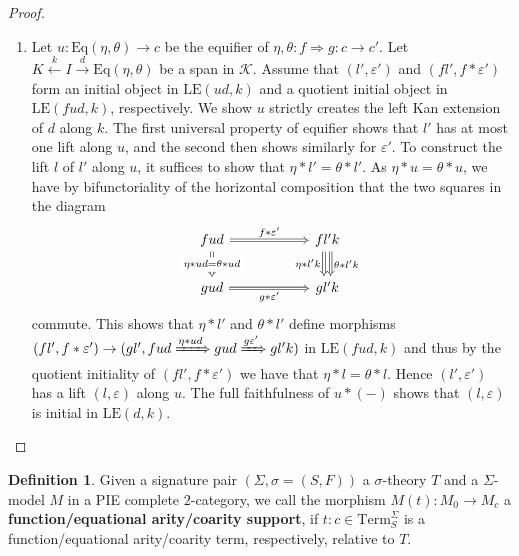 \documentclass[11pt]{article}
\theoremstyle{plain}
\theoremstyle{definition}
\newtheorem{definition}[theorem]{Definition}
\numberwithin{equation}{section}
\newcommand{\K}{\mathcal{K}}
\newcommand{\Term}{\mathrm{Term}}
\newcommand{\Eq}{\mathrm{Eq}}
\newcommand{\LE}{\mathrm{LE}}
\begin{document}
\begin{proof}
\begin{enumerate}
       \item Let $u\colon \Eq(\eta,\theta)\to c$ be the equifier of $\eta,\theta\colon f\Rightarrow g\colon c\to c'$. Let $K\xleftarrow{k}I\xrightarrow{d} \Eq(\eta,\theta)$ be a span in $\K$. Assume that $(l',\varepsilon')$ and $(fl',f*\varepsilon')$ form an initial object in $\LE(ud,k)$ and a quotient initial object in $\LE(fud,k)$, respectively. We show $u$ strictly creates the left Kan extension of $d$ along $k$. The first universal property of equifier shows that $l'$ has at most one lift along $u$, and the second then shows similarly for $\varepsilon'$. To construct the lift $l$ of $l'$ along $u$, it suffices to show that $\eta*l' = \theta*l'$. As $\eta*u = \theta *u$, we have by bifunctoriality of the horizontal composition that the two squares in the diagram
       $$
       \begin{tikzcd}[column sep = 2 cm]
fud \arrow[d, "\eta*ud = \theta*ud" description, Rightarrow] \arrow[r, "f*\varepsilon'", Rightarrow] & fl'k \arrow[d, "\theta*l'k", shift left, Rightarrow] \arrow[d, "\eta*l'k"', shift right, Rightarrow] \\
gud \arrow[r, "g*\varepsilon'"', Rightarrow]                                              & gl'k                                                                         
\end{tikzcd}
       $$
       commute. This shows that $\eta*l'$ and $\theta*l'$ define morphisms $(fl',f*\varepsilon')\to (gl', fud\xRightarrow{\eta*ud}gud\xRightarrow{g\varepsilon'}gl'k)$ in $\LE(fud,k)$ and thus by the quotient initiality of $(fl',f*\varepsilon')$ we have that $\eta*l = \theta*l$. Hence $(l',\varepsilon')$ has a lift $(l,\varepsilon)$ along $u$. The full faithfulness of $u*(-)$ shows that $(l,\varepsilon)$ is initial in $\LE(d,k)$. \qedhere

   \end{enumerate}
\end{proof}
\begin{definition}
Given a signature pair $(\Sigma,\sigma = (S,F))$ a $\sigma$-theory $T$ and a $\Sigma$-model $M$ in a PIE complete $2$-category, we call the morphism $M(t)\colon M_0\to M_c$ a \textbf{function/equational arity/coarity support}, if $t\colon c\in \Term_S^\Sigma$ is a function/equational arity/coarity term, respectively, relative to $T$.
\end{definition}
\end{document}
